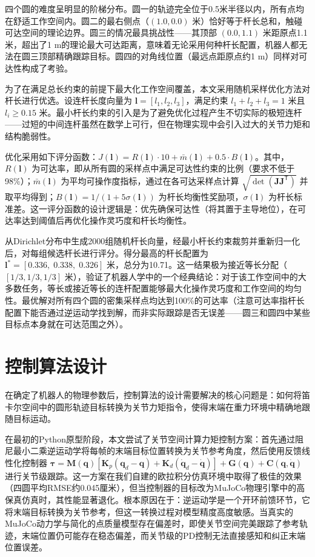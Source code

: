 \documentclass{article}
\begin{document}
四个圆的难度呈明显的阶梯分布。圆一的轨迹完全位于0.5米半径以内，所有点均在舒适工作空间内。圆二的最右侧点（\((1.0, 0.0)\) 米）恰好等于杆长总和，触碰可达空间的理论边界。圆三的情况最具挑战性——其顶部 \((0.0, 1.1)\) 米距原点1.1米，超出了1 m的理论最大可达距离，意味着无论采用何种杆长配置，机器人都无法在圆三顶部精确跟踪目标。圆四的对角线位置（最远点距原点约1 m）同样对可达性构成了考验。

为了在满足总长约束的前提下最大化工作空间覆盖，本文采用随机采样优化方法对杆长进行优选。设连杆长度向量为 \(\boldsymbol{l} = [l_1, l_2, l_3]\)，满足约束 \(l_1+l_2+l_3 = 1\) 米且 \(l_i \geq 0.15\) 米。最小杆长约束的引入是为了避免优化过程产生不切实际的极短连杆——过短的中间连杆虽然在数学上可行，但在物理实现中会引入过大的关节力矩和结构脆弱性。

优化采用如下评分函数：\(J(\boldsymbol{l}) = R(\boldsymbol{l})\cdot 10 + \bar{m}(\boldsymbol{l}) + 0.5\cdot B(\boldsymbol{l})\)。其中，\(R(\boldsymbol{l})\) 为可达率，即从所有圆的采样点中满足可达性约束的比例（要求不低于98\%）；\(\bar{m}(\boldsymbol{l})\) 为平均可操作度指标，通过在各可达采样点计算 \(\sqrt{\det(\boldsymbol{J}\boldsymbol{J}^{\mathsf{T}})}\) 并取平均得到；\(B(\boldsymbol{l}) = 1/(1+5\sigma(\boldsymbol{l}))\) 为杆长均衡性奖励项，\(\sigma(\boldsymbol{l})\) 为杆长标准差。这一评分函数的设计逻辑是：优先确保可达性（将其置于主导地位），在可达率达到阈值后再优化操作灵巧度和杆长均衡性。

从Dirichlet分布中生成2000组随机杆长向量，经最小杆长约束裁剪并重新归一化后，对每组候选杆长进行评分。得分最高的杆长配置为 \(\boldsymbol{l}^* = [0.336,\; 0.338,\; 0.326]\) 米，总分为10.71。这一结果极为接近等长分配（\([1/3, 1/3, 1/3]\) 米），验证了机器人学中的一个经典结论：对于该工作空间中的大多数任务，等长或接近等长的连杆配置能够最大化操作灵巧度和工作空间的均匀性。最优解对所有四个圆的密集采样点均达到100\%的可达率（注意可达率指杆长配置下能否通过逆运动学找到解，而非实际跟踪是否无误差——圆三和圆四中某些目标点本身就在可达范围之外）。

\section{控制算法设计}

在确定了机器人的物理参数后，控制算法的设计需要解决的核心问题是：如何将笛卡尔空间中的圆形轨迹目标转换为关节力矩指令，使得末端在重力环境中精确地跟随目标运动。

在最初的Python原型阶段，本文尝试了关节空间计算力矩控制方案：首先通过阻尼最小二乘逆运动学将每帧的末端目标位置转换为关节参考角度，然后使用反馈线性化控制器 \(\boldsymbol{\tau} = \boldsymbol{M}(\boldsymbol{q})[\boldsymbol{K}_p(\boldsymbol{q}_d - \boldsymbol{q}) + \boldsymbol{K}_d(\dot{\boldsymbol{q}}_d - \dot{\boldsymbol{q}})] + \boldsymbol{G}(\boldsymbol{q}) + \boldsymbol{C}(\boldsymbol{q}, \dot{\boldsymbol{q}})\) 进行关节级跟踪。这一方案在我们自建的欧拉积分仿真环境中取得了极佳的效果（四圆平均RMSE约0.045厘米），但当控制器的目标改为MuJoCo物理引擎中的高保真仿真时，其性能显著退化。根本原因在于：逆运动学是一个开环前馈环节，它将末端目标转换为关节参考，但这一转换过程对模型精度高度敏感。当真实的MuJoCo动力学与简化的点质量模型存在偏差时，即使关节空间完美跟踪了参考轨迹，末端位置仍可能存在稳态偏差，而关节级的PD控制无法直接感知和纠正末端位置误差。
\end{document}
